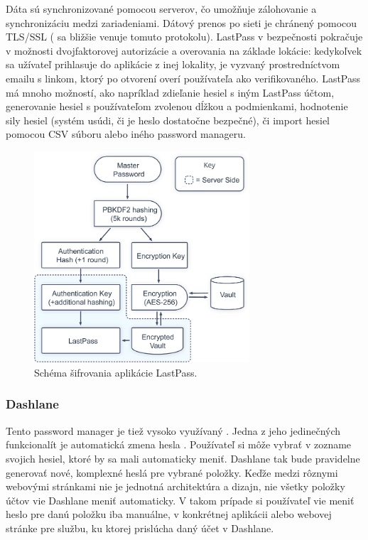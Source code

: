 Dáta sú synchronizované pomocou serverov, čo umožňuje zálohovanie a synchronizáciu medzi zariadeniami. Dátový prenos po sieti je chránený pomocou TLS/SSL (\cite{tls} sa bližšie venuje tomuto protokolu). LastPass v bezpečnosti pokračuje v možnosti dvojfaktorovej autorizácie a overovania na základe lokácie: kedykoľvek sa užívateľ prihlasuje do aplikácie z inej lokality, je vyzvaný prostredníctvom emailu s linkom, ktorý po otvorení overí používateľa ako verifikovaného. LastPass má mnoho možností, ako napríklad zdieľanie hesiel s iným LastPass účtom, generovanie hesiel s používateľom zvolenou dĺžkou a podmienkami, hodnotenie sily hesiel (systém usúdi, či je heslo dostatočne bezpečné), či import hesiel pomocou CSV súboru alebo iného password manageru.
\newline
\begin{figure}[ht]
  \centering
  \includegraphics[width=8cm]{img/lastpass.png}
  \caption{Schéma šifrovania aplikácie LastPass.}
\end{figure}

\subsubsection{Dashlane}
Tento password manager je tiež vysoko využívaný \cite{dashlane_10million_users}. Jedna z jeho jedinečných funkcionalít je automatická zmena hesla \cite{dashlane_password_changer}. Používateľ si môže vybrať v zozname svojich hesiel, ktoré by sa mali automaticky meniť. Dashlane tak bude pravidelne generovať nové, komplexné heslá pre vybrané položky. Keďže medzi rôznymi webovými stránkami nie je jednotná architektúra a dizajn, nie všetky položky účtov vie Dashlane meniť automaticky. V takom prípade si používateľ vie meniť heslo pre danú položku iba manuálne, v konkrétnej aplikácii alebo webovej stránke pre službu, ku ktorej prislúcha daný účet v Dashlane.

